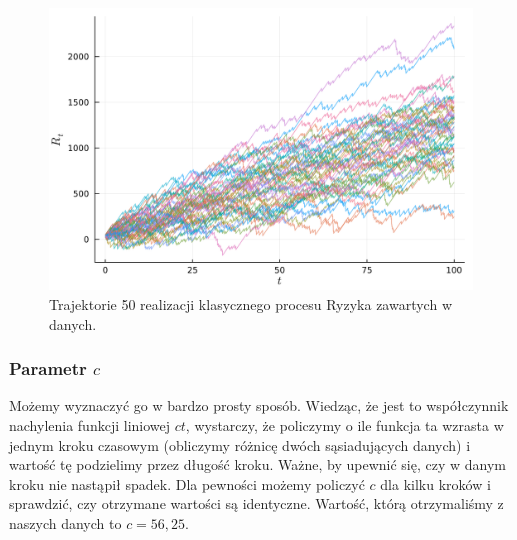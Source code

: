 \documentclass[12pt]{mwart}
\begin{document}
	\begin{figure}[H]
		\centering
		\includegraphics[width=\columnwidth]{fig/trajektorie_1.pdf}
		\caption{Trajektorie 50 realizacji klasycznego procesu Ryzyka zawartych w danych.}
	\end{figure}
	
	\subsubsection{Parametr {\boldmath $c$}}
	\noindent Możemy wyznaczyć go w bardzo prosty sposób. Wiedząc, że jest to współczynnik nachylenia funkcji liniowej $ct$, wystarczy, że policzymy o ile funkcja ta wzrasta w jednym kroku czasowym (obliczymy różnicę dwóch sąsiadujących danych) i wartość tę podzielimy przez długość kroku. Ważne, by upewnić się, czy w danym kroku nie nastąpił spadek. Dla pewności możemy policzyć $c$ dla kilku kroków i sprawdzić, czy otrzymane wartości są identyczne. Wartość, którą otrzymaliśmy z naszych danych to $c = 56,25$.
	
\end{document}
